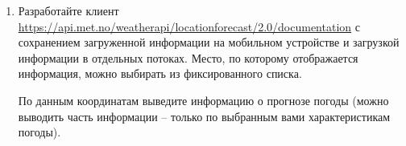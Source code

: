 \begin{enumerate}

	\item Разработайте клиент \url{https://api.met.no/weatherapi/locationforecast/2.0/documentation} с сохранением загруженной информации на мобильном устройстве и загрузкой
		информации в отдельных потоках. Место, по которому отображается информация, можно выбирать из фиксированного списка.

		По данным координатам выведите информацию о прогнозе погоды (можно выводить часть информации -- только по выбранным вами характеристикам
		погоды).







\end{enumerate}
